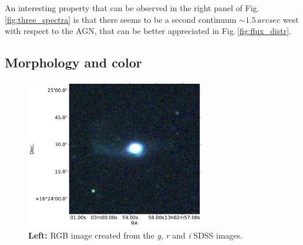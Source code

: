 \documentclass[../main.tex]{subfiles}
\begin{document}
An interesting property that can be observed in the right panel of Fig.\,\ref{fig:three_spectra} is that there seems to be a second continuum $\sim 1.5\,\si{arcsec}$ west with respect to the AGN, that can be better appreciated in Fig.\,\ref{fig:flux_distr}.

\subsection{Morphology and color}
\label{sec:morph_color}

\begin{figure}
\centering
\includegraphics[width=0.7\textwidth]{images/paper3/new_rgb.pdf} %
\caption[]{\textbf{Left:} RGB image created from the \emph{g}, \emph{r} and \emph{i} SDSS images.} %
\label{fig:rgb_sdss}
\end{figure} 
\end{document}
